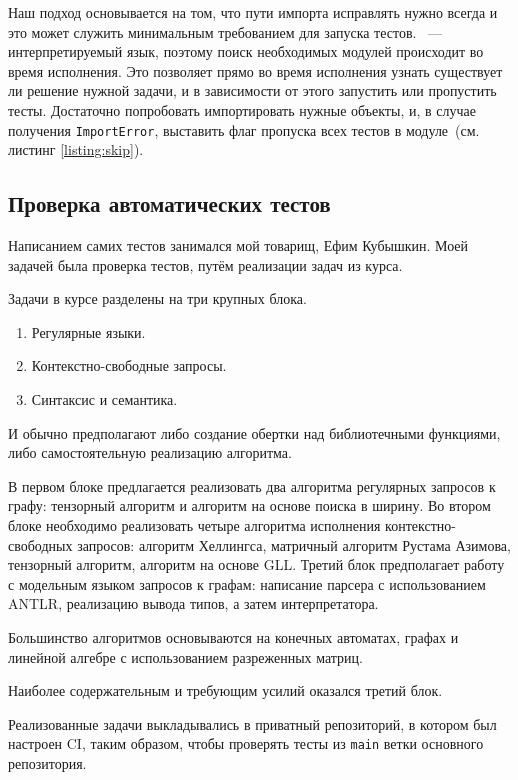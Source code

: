 Наш подход основывается на том, что пути импорта исправлять нужно всегда и это может служить минимальным требованием для запуска тестов.
\python{}~--- интерпретируемый язык, поэтому поиск необходимых модулей происходит во время исполнения.
Это позволяет прямо во время исполнения узнать существует ли решение нужной задачи, и в зависимости от этого запустить или пропустить тесты.
Достаточно попробовать импортировать нужные объекты, и, в случае получения \texttt{ImportError}, выставить флаг пропуска всех тестов в модуле~(см. листинг \ref{listing:skip}).

\subsection{Проверка автоматических тестов}
\label{subsec:slns}

Написанием самих тестов занимался мой товарищ, Ефим Кубышкин.
Моей задачей была проверка тестов, путём реализации задач из курса.

Задачи в курсе разделены на три крупных блока.
\begin{enumerate}
    \item Регулярные языки.
    \item Контекстно-свободные запросы.
    \item Синтаксис и семантика.
\end{enumerate}
И обычно предполагают либо создание обертки над библиотечными функциями, либо самостоятельную реализацию алгоритма.

В первом блоке предлагается реализовать два алгоритма регулярных запросов к графу: тензорный алгоритм и алгоритм на основе поиска в ширину.
Во втором блоке необходимо реализовать четыре алгоритма исполнения контекстно-свободных запросов: алгоритм Хеллингса, матричный алгоритм Рустама Азимова, тензорный алгоритм, алгоритм на основе GLL.
Третий блок предполагает работу с модельным языком запросов к графам: написание парсера с использованием \textsc{ANTLR}, реализацию вывода типов, а затем интерпретатора.

Большинство алгоритмов основываются на конечных автоматах, графах и линейной алгебре с использованием разреженных матриц.

Наиболее содержательным и требующим усилий оказался третий блок.

Реализованные задачи выкладывались в приватный репозиторий, в котором был настроен CI, таким образом, чтобы проверять тесты из \texttt{main} ветки основного репозитория.

